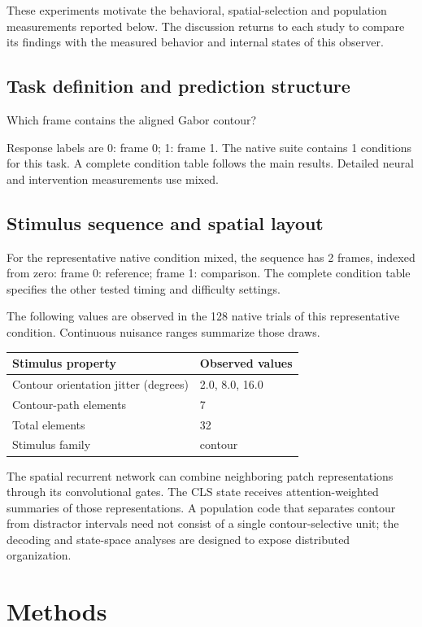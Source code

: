 \documentclass[11pt]{article}
\begin{document}
These experiments motivate the behavioral, spatial-selection and population measurements reported below. The discussion returns to each study to compare its findings with the measured behavior and internal states of this observer.
\subsection{Task definition and prediction structure}
Which frame contains the aligned Gabor contour?

Response labels are 0: frame 0; 1: frame 1. The native suite contains 1 conditions for this task. A complete condition table follows the main results. Detailed neural and intervention measurements use mixed.

\subsection{Stimulus sequence and spatial layout}
For the representative native condition mixed, the sequence has 2 frames, indexed from zero: frame 0: reference; frame 1: comparison. The complete condition table specifies the other tested timing and difficulty settings.

The following values are observed in the 128 native trials of this representative condition. Continuous nuisance ranges summarize those draws.
\begin{center}\small\begin{tabular}{p{}p{}}\toprule Stimulus property & Observed values\\\midrule
Contour orientation jitter (degrees) & 2.0, 8.0, 16.0\\
Contour-path elements & 7\\
Total elements & 32\\
Stimulus family & contour\\
\bottomrule\end{tabular}\normalsize\end{center}
The spatial recurrent network can combine neighboring patch representations through its convolutional gates. The CLS state receives attention-weighted summaries of those representations. A population code that separates contour from distractor intervals need not consist of a single contour-selective unit; the decoding and state-space analyses are designed to expose distributed organization.


\section{Methods}
\end{document}
